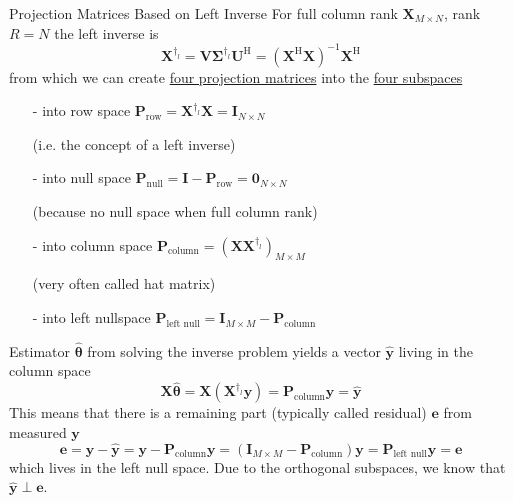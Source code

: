 \documentclass[mathserif, aspectratio=1610]{intbeamer}
\begin{document}
\begin{frame}{Projection Matrices Based on Left Inverse}
For full column rank $\bm{X}_{M \times N}$, rank $R=N$ the left inverse is
$$\bm{X}^{\dagger_l} = \bm{V} \bm{\Sigma}^{\dagger_l}\bm{U}^\mathrm{H} = (\bm{X}^\mathrm{H}\bm{X})^{-1} \bm{X}^\mathrm{H}$$
from which we can create \underline{four projection matrices} into the \underline{four subspaces}
\begin{itemize}
\item[-] into \textcolor{C2}{row space} $\bm{P}_\text{row} = \bm{X}^{\dagger_l} \bm{X} = \bm{I}_{N \times N}$ \begin{footnotesize}(i.e. the concept of a left inverse)\end{footnotesize}
\item[-] into \textcolor{C1}{null space} $\bm{P}_\text{null} = \bm{I} - \bm{P}_\text{row} = \bm{0}_{N \times N}$ \begin{footnotesize}(because no null space when full column rank)\end{footnotesize}
\item[-] into \textcolor{C0}{column space} $\bm{P}_\text{column} = (\bm{X} \bm{X}^{\dagger_l})_{M \times M}$ \begin{footnotesize}(very often called hat matrix)\end{footnotesize}
\item[-] into \textcolor{C4}{left nullspace} $\bm{P}_\text{left null} = \bm{I}_{M \times M} - \bm{P}_\text{column}$
\end{itemize}

Estimator $\hat{\bm{\theta}}$ from solving the inverse problem yields a vector $\hat{\bm{y}}$ living in the column space
$$\bm{X} \hat{\bm{\theta}} = \bm{X} (\bm{X}^{\dagger_l} \bm{y}) = \bm{P}_\text{column} \bm{y} = \hat{\bm{y}}$$
This means that there is a remaining part (typically called residual) $\bm{e}$ from measured $\bm{y}$
$$\bm{e} = \bm{y} - \hat{\bm{y}} = \bm{y} - \bm{P}_\text{column} \bm{y} = (\bm{I}_{M \times M} - \bm{P}_\text{column}) \bm{y}=
\bm{P}_\text{left null} \bm{y} = \bm{e}$$
which lives in the left null space. Due to the orthogonal subspaces, we know that $\hat{\bm{y}} \perp \bm{e}$.
\end{frame}
\end{document}
